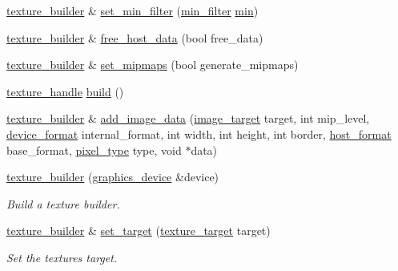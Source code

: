 \begin{DoxyCompactItemize}
\item 
\mbox{\hyperlink{classmoka_1_1texture__builder}{texture\+\_\+builder}} \& \mbox{\hyperlink{classmoka_1_1texture__builder_a308c57f97f3d9477f0b15e31ef37cf4c}{set\+\_\+min\+\_\+filter}} (\mbox{\hyperlink{namespacemoka_afeea6a53d61ee8561c91c62f5a051a77}{min\+\_\+filter}} \mbox{\hyperlink{namespacemoka_acf03408f89c521244763fb5f8746ce16ad8bd79cc131920d5de426f914d17405a}{min}})
\item 
\mbox{\hyperlink{classmoka_1_1texture__builder}{texture\+\_\+builder}} \& \mbox{\hyperlink{classmoka_1_1texture__builder_a64f4ead902072e54312ea7d4a7d290bd}{free\+\_\+host\+\_\+data}} (bool free\+\_\+data)
\item 
\mbox{\hyperlink{classmoka_1_1texture__builder}{texture\+\_\+builder}} \& \mbox{\hyperlink{classmoka_1_1texture__builder_a5dd6e175a28e9dd958c08103e48e30d6}{set\+\_\+mipmaps}} (bool generate\+\_\+mipmaps)
\item 
\mbox{\hyperlink{structmoka_1_1texture__handle}{texture\+\_\+handle}} \mbox{\hyperlink{classmoka_1_1texture__builder_a7bdc422d994555b2b9d6766a0e8b9a0d}{build}} ()
\item 
\mbox{\hyperlink{classmoka_1_1texture__builder}{texture\+\_\+builder}} \& \mbox{\hyperlink{classmoka_1_1texture__builder_ae90b0d4367a36e031d136970805cd311}{add\+\_\+image\+\_\+data}} (\mbox{\hyperlink{namespacemoka_a6f402ae62a72ce17ff73fa94d526800e}{image\+\_\+target}} target, int mip\+\_\+level, \mbox{\hyperlink{namespacemoka_ac2d188857be60286ff735744a33ebd2d}{device\+\_\+format}} internal\+\_\+format, int width, int height, int border, \mbox{\hyperlink{namespacemoka_a1989c05aecf3bb10bbf8a7027e3df130}{host\+\_\+format}} base\+\_\+format, \mbox{\hyperlink{namespacemoka_a067d388d48715c4e725cd426d5bf3770}{pixel\+\_\+type}} type, void $\ast$data)
\item 
\mbox{\hyperlink{classmoka_1_1texture__builder_a37e13acb817ac3f5f5003278ae13bea0}{texture\+\_\+builder}} (\mbox{\hyperlink{classmoka_1_1graphics__device}{graphics\+\_\+device}} \&device)
\begin{DoxyCompactList}\small\item\em Build a texture builder. \end{DoxyCompactList}\item 
\mbox{\hyperlink{classmoka_1_1texture__builder}{texture\+\_\+builder}} \& \mbox{\hyperlink{classmoka_1_1texture__builder_ac4ce6bf2b9e2d92867a8134f235016df}{set\+\_\+target}} (\mbox{\hyperlink{namespacemoka_a259bf395c8f07bd8d13515efcb542623}{texture\+\_\+target}} target)
\begin{DoxyCompactList}\small\item\em Set the texture\textquotesingle{}s target. \end{DoxyCompactList}\item 

\end{DoxyCompactItemize}
